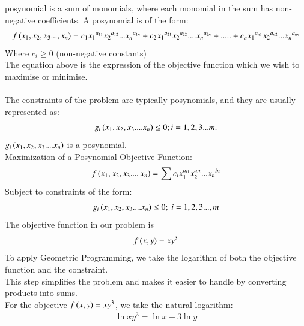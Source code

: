 \documentclass[journal]{IEEEtran}
\begin{document}
 posynomial is a sum of monomials, where each monomial in the sum has non-negative coefficients. A posynomial is of the form:
 \begin{align}
     f\left(x_1,x_2,x_3...,x_n\right) = c_1{x_1}^{a_{11}}{x_2}^{a_{12}}...{x_n}^{a_{1n}} + c_2{x_1}^{a_{21}}{x_2}^{a_{22}}....{x_n}^{a_{2n}} + .....+ c_n{x_1}^{a_{n1}}{x_2}^{a_{n2}}...{x_n}^{a_{nn}}
 \end{align}
 Where $c_i\geq 0$ (non-negative constants)\\
 The equation above is the expression of the objective function which we wish to maximise or minimise.\\
 \\ The constraints of the problem are typically posynomials, and they are usually represented as:
 \begin{align}
     g_i\left(x_1,x_2,x_3....x_n\right) \leq 0 ; i = 1,2,3...m.
 \end{align}
 $g_i\left(x_1,x_2,x_3....x_n\right)$ is a posynomial.\\
Maximization of a Posynomial Objective Function:
\begin{align}
    f\left(x_1,x_2,x_3...,x_n\right) = \sum c_ix_1^{a_{i1}}x_2^{a_{i2}}...{x_n}^{in}
\end{align}
Subject to constraints of the form:
\begin{align}
    g_i\left(x_1,x_2,x_3....x_n\right) \leq 0;\ i = 1,2,3...,m
\end{align}
The objective function in our problem is
\begin{align}
    f\left(x,y\right) = xy^3
\end{align}
To apply Geometric Programming, we take the logarithm of both the objective function and the constraint.\\
This step simplifies the problem and makes it easier to handle by converting products into sums.\\
For the objective $f\left(x,y\right) = xy^3$, we take the natural logarithm:\\
\begin{align}
    \ln{xy^3} = \ln{x} + 3\ln{y}
\end{align}
\end{document}

